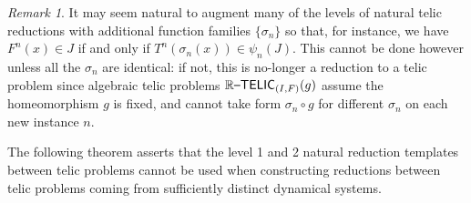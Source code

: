 \documentclass{amsart}
\theoremstyle{theorem}
\theoremstyle{remark}
\newtheorem{remark}[theorem]{Remark}
\newcommand{\ccRTELIC}{\mathbb{R}\textsf{\upshape --TELIC}}
\begin{document}
\begin{remark}
It may seem natural to augment many of the levels of natural telic reductions with additional function families $\{\sigma_n\}$ so that, for instance, we have $F^n(x) \in J$ if and only if $T^n(\sigma_n(x)) \in \psi_n(J)$. This cannot be done however unless all the $\sigma_n$ are identical: if not, this is no-longer a reduction to a telic problem since algebraic telic problems $\ccRTELIC_{(I, F)}(g)$ assume the homeomorphism $g$ is fixed, and cannot take form $\sigma_n\circ g$ for different $\sigma_n$ on each new instance $n$.
\end{remark}

The following theorem asserts that the level 1 and 2 natural reduction templates between telic problems cannot be used when constructing reductions between telic problems coming from sufficiently distinct dynamical systems.
\end{document}
